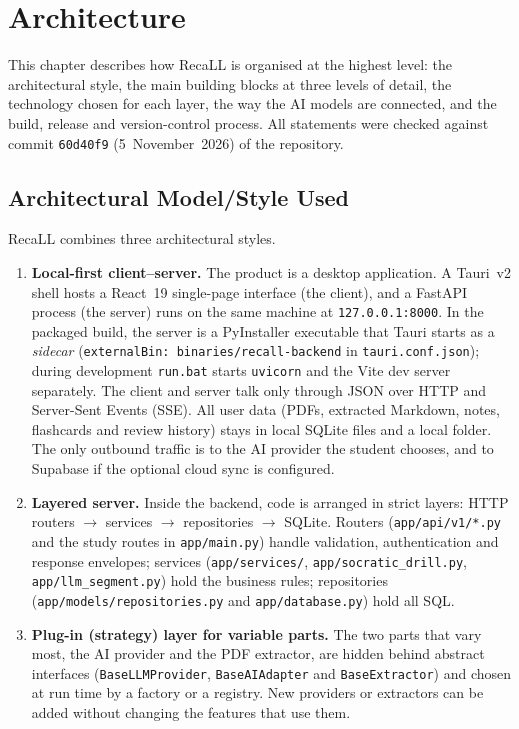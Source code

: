 \chapter{Architecture}\label{ch:arch}

This chapter describes how RecaLL is organised at the highest level: the architectural
style, the main building blocks at three levels of detail, the technology chosen for
each layer, the way the AI models are connected, and the build, release and
version-control process. All statements were checked against commit \texttt{60d40f9}
(5~November~2026) of the repository.

\section{Architectural Model/Style Used}\label{sec:arch_style}

RecaLL combines three architectural styles.

\begin{enumerate}[leftmargin=*]
  \item \textbf{Local-first client--server.} The product is a desktop application. A
    Tauri~v2 shell hosts a React~19 single-page interface (the client), and a FastAPI
    process (the server) runs on the same machine at \texttt{127.0.0.1:8000}. In the
    packaged build, the server is a PyInstaller executable that Tauri starts as a
    \emph{sidecar} (\texttt{externalBin: binaries/recall-backend} in
    \texttt{tauri.conf.json}); during development \texttt{run.bat} starts
    \texttt{uvicorn} and the Vite dev server separately. The client and server talk only
    through JSON over HTTP and Server-Sent Events (SSE). All user data (PDFs, extracted
    Markdown, notes, flashcards and review history) stays in local SQLite files and a
    local folder. The only outbound traffic is to the AI provider the student chooses,
    and to Supabase if the optional cloud sync is configured.
  \item \textbf{Layered server.} Inside the backend, code is arranged in strict layers:
    HTTP routers $\rightarrow$ services $\rightarrow$ repositories $\rightarrow$ SQLite.
    Routers (\texttt{app/api/v1/*.py} and the study routes in \texttt{app/main.py})
    handle validation, authentication and response envelopes; services
    (\texttt{app/services/}, \texttt{app/socratic\_drill.py},
    \texttt{app/llm\_segment.py}) hold the business rules; repositories
    (\texttt{app/models/repositories.py} and \texttt{app/database.py}) hold all SQL.
  \item \textbf{Plug-in (strategy) layer for variable parts.} The two parts that vary
    most, the AI provider and the PDF extractor, are hidden behind abstract interfaces
    (\texttt{BaseLLMProvider}, \texttt{BaseAIAdapter} and \texttt{BaseExtractor}) and
    chosen at run time by a factory or a registry. New providers or extractors can be
    added without changing the features that use them.
\end{enumerate}

